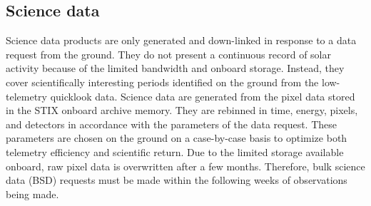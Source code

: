 \documentclass[referee]{aa} %
\begin{document}
\subsection{Science data }
Science data products are only generated and down-linked in response to a data request from the ground. They do not present a continuous record of solar activity because of the limited bandwidth and onboard storage.  Instead, they cover scientifically interesting periods identified on the ground from the low-telemetry quicklook data. Science data are generated from the pixel data stored in the STIX onboard archive memory.  They are rebinned in time, energy, pixels, and detectors in accordance with the parameters of the data request.  These parameters are chosen on the ground on a case-by-case basis to optimize both telemetry efficiency and scientific return.  Due to the limited storage available onboard, raw pixel data is overwritten after a few months.  Therefore, bulk science data (BSD) requests must be made within the following weeks of observations being made.
\end{document}
